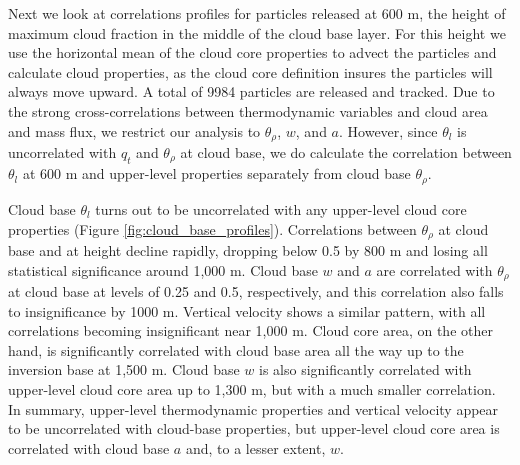 \documentclass[acp]{copernicus}
\begin{document}
Next we look at correlations profiles for particles released at 600 m, the 
height of maximum cloud fraction in the middle of the cloud base layer.
For this height we use the horizontal mean of the cloud core properties to 
advect the particles and calculate cloud properties, as the cloud core 
definition insures the particles will always move upward.  A total of 
9984 particles are released and tracked.  Due to the strong cross-correlations 
between thermodynamic variables and cloud area and mass flux, we restrict our 
analysis to $\theta_\rho$, $w$, and $a$.  However, since $\theta_l$ is 
uncorrelated with $q_t$ and $\theta_\rho$ at cloud base, we do calculate the 
correlation between $\theta_l$ at 600 m and upper-level properties separately 
from cloud base $\theta_\rho$.

Cloud base $\theta_l$ turns out to be uncorrelated with any upper-level 
cloud core properties (Figure \ref{fig:cloud_base_profiles}).  Correlations 
between $\theta_\rho$ at cloud base and at height decline rapidly, dropping 
below 0.5 by 800 m and losing all statistical significance around 1,000 m.  
Cloud base $w$ and $a$ are correlated with $\theta_\rho$ at cloud base at 
levels of 0.25 and 0.5, respectively, and this correlation also falls to 
insignificance by 1000 m.  Vertical velocity shows a similar pattern, with all 
correlations becoming insignificant near 1,000 m.  Cloud core area, on the 
other hand, is significantly correlated with cloud base area all the way up to 
the inversion base at 1,500 m.  Cloud base $w$ is also significantly correlated 
with upper-level cloud core area up to 1,300 m, but with a much smaller 
correlation.  In summary, upper-level thermodynamic properties and vertical 
velocity appear to be uncorrelated with cloud-base properties, but upper-level 
cloud core area is correlated with cloud base $a$ and, to a lesser extent, $w$.
\end{document}

